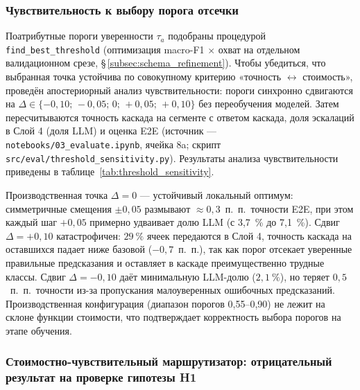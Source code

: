 \subsubsection{Чувствительность к выбору порога отсечки}
\label{sec:threshold_sensitivity}

Поатрибутные пороги уверенности $\tau_a$ подобраны процедурой \texttt{find\_best\_threshold} (оптимизация macro-F1$\,\times\,$охват на отдельном валидационном срезе, \S\,\ref{subsec:schema_refinement}). Чтобы убедиться, что выбранная точка устойчива по совокупному критерию «точность $\leftrightarrow$ стоимость», проведён апостериорный анализ чувствительности: пороги синхронно сдвигаются на $\Delta\in\{-0{,}10;\,-0{,}05;\,0;\,+0{,}05;\,+0{,}10\}$ без переобучения моделей. Затем пересчитываются точность каскада на сегменте с ответом каскада, доля эскалаций в Слой 4 (доля LLM) и оценка E2E (источник --- \texttt{notebooks/03\_evaluate.ipynb}, ячейка 8a; скрипт \texttt{src/eval/threshold\_sensitivity.py}). Результаты анализа чувствительности приведены в таблице~\ref{tab:threshold_sensitivity}.

\begin{table}[h!]
\caption{Чувствительность каскада к синхронному сдвигу всех порогов отсечки. Знаменатель — ячейки с ответом каскада; доля LLM --- доля ячеек, переданных в Слой 4. Все категории: pasta+chocolate+cheeses, $n_{\text{в области применимости}}=17\,174$}
\label{tab:threshold_sensitivity}
\begin{center}

\end{center}
\end{table}

Производственная точка $\Delta=0$ --- устойчивый локальный оптимум: симметричные смещения $\pm 0{,}05$ размывают $\approx 0{,}3$~п.~п.\ точности E2E, при этом каждый шаг $+0{,}05$ примерно удваивает долю LLM (с 3{,}7~\% до 7{,}1~\%). Сдвиг $\Delta=+0{,}10$ катастрофичен: $29~\%$ ячеек передаются в Слой 4, точность каскада на оставшихся падает ниже базовой ($-0{,}7$~п.~п.), так как порог отсекает уверенные правильные предсказания и оставляет в каскаде преимущественно трудные классы. Сдвиг $\Delta=-0{,}10$ даёт минимальную LLM-долю ($2{,}1~\%$), но теряет $0{,}5$~п.~п.\ точности из-за пропускания малоуверенных ошибочных предсказаний. Производственная конфигурация (диапазон порогов 0{,}55--0{,}90) не лежит на склоне функции стоимости, что подтверждает корректность выбора порогов на этапе обучения.

\subsubsection{Стоимостно-чувствительный маршрутизатор: отрицательный результат на проверке гипотезы H1}
\label{subsubsec:h1_router}

